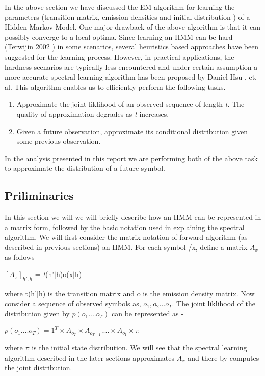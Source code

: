 \documentclass{article} %
\begin{document}
In the above section we have discussed the EM algorithm for learning the parameters (transition matrix, emission densities and initial distribution ) of a Hidden Markov Model. One major drawback of the above algorithm is that it can possibly converge to a local optima. Since learning an HMM can be hard (Terwijin 2002 ) in some scenarios, several heuristics based approaches have been suggested for the learning process. However, in practical applications, the hardness scenarios are typically less encountered and under certain assumption a more accurate spectral learning algorithm has been proposed by Daniel Hsu , et. al.  This algorithm enables us to efficiently perform the following tasks.
\begin{enumerate}
	\item Approximate the joint liklihood of an observed sequence of length \textit{t}. The quality of approximation degrades as \textit{t} increases.
	\item Given a future observation, approximate its conditional distribution given some previous observation. 
\end{enumerate}
In the analysis presented in this report we are performing both of the above task to approximate the distribution of a future symbol.
\subsection{Priliminaries}
In this section we will we will briefly describe how an HMM can be represented in a matrix form, followed by the basic notation used in explaining the spectral algorithm. 
\newline
We will first consider the matrix notation of forward algorithm (as described in previous sections) an HMM. For each symbol /x, define a matrix $A_x$ as follows -
\begin{center}
$[A_x]_{h',h}$ = \textit{t}(h'$\vert$h)o(x$\vert$h) 

\end{center}
 
where t(h'$\vert$h) is the transition matrix and o is the emission density matrix.
Now consider a sequence of observed symbols as, $o_1,o_2...o_T$. The joint liklihood of the distribution given by $p(o_1....o_T)$ can be represented as -
\begin{center}
$p(o_1....o_T) = 1^T \times A_{o_T} \times A_{o_{T-1}} . . . . \times A_{o_1} \times \pi$
\end{center}
where $\pi$ is the initial state distribution. We will see that the spectral learning algorithm described in the later sections approximates $A_x$ and there by computes the joint distribution.
\end{document}
